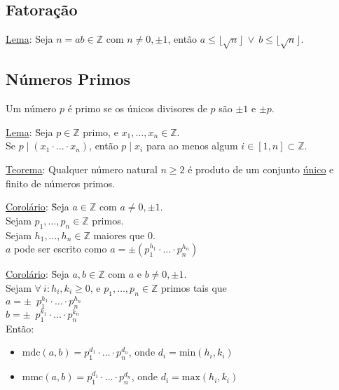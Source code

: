 \documentclass{article}
\begin{document}
\subsection{Fatoração}
\uline{Lema}: Seja $n = ab \in \mathbb{Z}$ com $n \neq 0, \pm 1$, então $a \leq \lfloor \sqrt{n} \rfloor \>\lor\> b \leq \lfloor \sqrt{n} \rfloor$.


\subsection{Números Primos}
Um número $p$ é primo se os únicos divisores de $p$ são $\pm1$ e $\pm p$.
\begin{tabbing}
  \uline{Lema}: \= Seja $p \in \mathbb{Z}$ primo, e $x_1, \hdots, x_n \in \mathbb{Z}$. \\
  \> Se $p \mid (x_1 \cdot \hdots \cdot x_n)$, então $p \mid x_i$ para ao menos algum $i \in [1, n] \subset \mathbb{Z}$.
\end{tabbing}
\vspace{10pt}
\uline{Teorema}: Qualquer número natural $n \geq 2$ é produto de um conjunto \uline{único} e finito de números primos.
\begin{tabbing}
  \uline{Corolário}: \= Seja $a \in \mathbb{Z}$ com $a \neq 0, \pm 1$. \\
  \> Sejam $p_1, \hdots, p_n \in \mathbb{Z}$ primos. \\
  \> Sejam $h_1, \hdots, h_n \in \mathbb{Z}$ maiores que $0$. \\
  \> $a$ pode ser escrito como $a = \pm \left( p_1^{h_1} \cdot \hdots \cdot p_n^{h_n} \right)$
\end{tabbing}
\begin{tabbing}
  \uline{Corolário}: \= Seja $a, b \in \mathbb{Z}$ com $a$ e $b \neq 0, \pm 1$. \\
  \> Sejam $\forall\: i : h_i, k_i \geq 0$, e $p_1, \hdots, p_n \in \mathbb{Z}$ primos tais que \\[3pt]
  \> $a = \pm \enspace p_1^{h_1} \cdot \hdots \cdot p_n^{h_n}$ \\[3pt]
  \> $b = \pm \enspace p_1^{k_1} \cdot \hdots \cdot p_n^{k_n}$ \\[3pt]
  \> Então: \\
  \>\begin{minipage}{\linewidth}
    \begin{itemize}
      \item $\text{mdc}(a,b) = p_1^{d_1} \cdot \hdots \cdot p_n^{d_n}$, onde $d_i = \text{min}(h_i, k_i)$
      \item $\text{mmc}(a,b) = p_1^{d_1} \cdot \hdots \cdot p_n^{d_n}$, onde $d_i = \text{max}(h_i, k_i)$
    \end{itemize}
  \end{minipage}
\end{tabbing}
\end{document}
